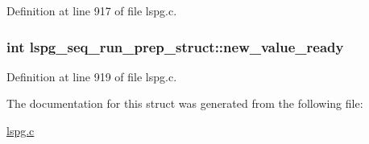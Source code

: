 Definition at line 917 of file lspg.c.\hypertarget{structlspg__seq__run__prep__struct_a42d08888327e9059ddd69ddfec31b8a9}{
\subsubsection[{new\_\-value\_\-ready}]{\setlength{\rightskip}{0pt plus 5cm}int {\bf lspg\_\-seq\_\-run\_\-prep\_\-struct::new\_\-value\_\-ready}}}
\label{structlspg__seq__run__prep__struct_a42d08888327e9059ddd69ddfec31b8a9}


Definition at line 919 of file lspg.c.

The documentation for this struct was generated from the following file:\begin{DoxyCompactItemize}
\item 
\hyperlink{lspg_8c}{lspg.c}\end{DoxyCompactItemize}
